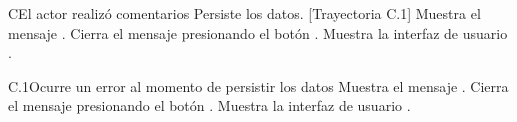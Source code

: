 \begin{UCtrayectoriaA}{C}{El actor realizó comentarios}
    \UCpaso Persiste los datos. [Trayectoria C.1]
    \UCpaso Muestra el mensaje .
    \UCpaso[\UCactor] Cierra el mensaje presionando el botón .
    \UCpaso Muestra la interfaz de usuario .
\end{UCtrayectoriaA}
\begin{UCtrayectoriaA}{C.1}{Ocurre un error al momento de persistir los datos}
    \UCpaso Muestra el mensaje .
    \UCpaso[\UCactor] Cierra el mensaje presionando el botón .
    \UCpaso Muestra la interfaz de usuario .
\end{UCtrayectoriaA}